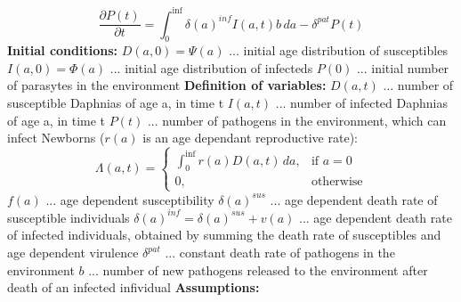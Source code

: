 \documentclass[10pt]{article}         %
\begin{document}
\begin{equation}
	\frac{\partial P(t)}{\partial t}= \int_{0}^{\inf} \delta(a)^{inf} I(a,t)b \, da - \delta^{pat}P(t)
\end{equation} \newline
\newline
\textbf{Initial conditions:}  \newline
$D(a,0)=\Psi(a)$ ... initial age distribution of susceptibles \newline
$I(a,0)=\Phi(a)$ ... initial age distribution of infecteds \newline
$P(0)$ ... initial number of parasytes in the environment \newline
\newline
\textbf{Definition of variables:}  \newline
$D(a,t)$ 	...		number of susceptible Daphnias of age a, in time t	\newline
$I(a,t)$ 	...		number of infected Daphnias of age a, in time t \newline
$P(t)$	...		number of pathogens in the environment, which can infect \newline
Newborns ($r(a)$ is an age dependant reproductive rate):
\[
    \Lambda(a,t)= 
\begin{cases}
    \int_0^{\inf}r(a)D(a,t)\, da,& \text{if } a = 0\\
    0,              & \text{otherwise}
\end{cases}
\]
$f(a)$ ... age dependent susceptibility \newline
$\delta(a)^{sus}$ ... age dependent death rate of susceptible individuals \newline\newline
$\delta(a)^{inf} = \delta(a)^{sus} + v(a)$ ... age dependent death rate of infected individuals, obtained by summing the death rate of susceptibles and age dependent virulence \newline
$\delta^{pat}$ ... constant death rate of pathogens in the environment \newline
$b$ ... number of new pathogens released to the environment after death of an infected infividual\newline
\newline
\textbf{Assumptions:}
\end{document}
